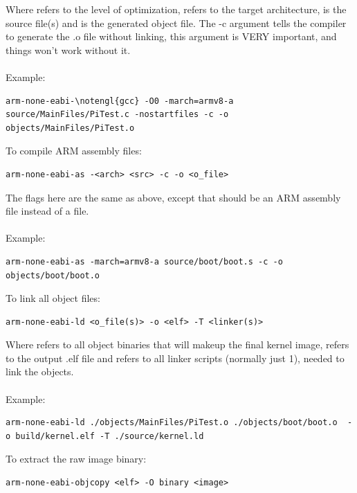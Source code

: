 \documentclass[12pt, svgnames]{book}
\begin{document}
Where  refers to the level of optimization,  refers to the target architecture,  is the source file(s) and  is the generated object file. The -c argument tells the compiler to generate the .o file without linking, this argument is VERY important, and things won't work without it.
\\~\\
Example:
\begin{lstlisting}[style = bash, xleftmargin=0\textwidth]
	arm-none-eabi-\notengl{gcc} -O0 -march=armv8-a source/MainFiles/PiTest.c -nostartfiles -c -o objects/MainFiles/PiTest.o
\end{lstlisting}

To compile ARM assembly files:
\begin{lstlisting}[style = bash, xleftmargin=0\textwidth]
	arm-none-eabi-as -<arch> <src> -c -o <o_file>
\end{lstlisting}

The flags here are the same as above, except that  should be an ARM assembly file instead of a  file.
\\~\\
Example:
\begin{lstlisting}[style = bash, xleftmargin=0\textwidth]
	arm-none-eabi-as -march=armv8-a source/boot/boot.s -c -o objects/boot/boot.o
\end{lstlisting}

To link all object files:
\begin{lstlisting}[style = bash, xleftmargin=0\textwidth]
	arm-none-eabi-ld <o_file(s)> -o <elf> -T <linker(s)>
\end{lstlisting}

Where  refers to all object binaries that will makeup the final kernel image,  refers to the output .elf file and  refers to all linker scripts (normally just 1), needed to link the objects.
\\~\\
Example:
\begin{lstlisting}[style = bash, xleftmargin=0\textwidth]
	arm-none-eabi-ld ./objects/MainFiles/PiTest.o ./objects/boot/boot.o  -o build/kernel.elf -T ./source/kernel.ld
\end{lstlisting}

To extract the raw image binary:
\begin{lstlisting}[style = bash, xleftmargin=0\textwidth]
	arm-none-eabi-objcopy <elf> -O binary <image>
\end{lstlisting}
\end{document}

